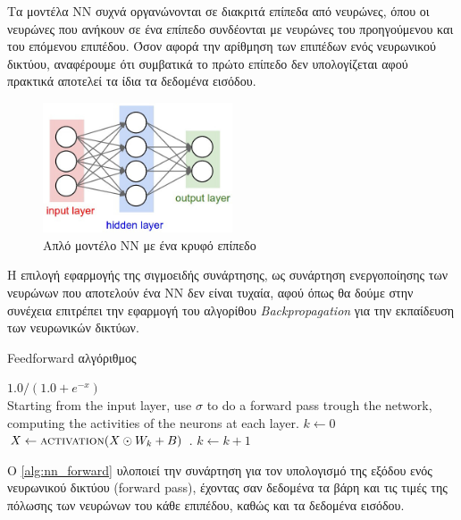 Τα μοντέλα ΝΝ συχνά οργανώνονται σε διακριτά επίπεδα από νευρώνες, όπου οι
νευρώνες που ανήκουν σε ένα επίπεδο συνδέονται με νευρώνες του
προηγούμενου και του επόμενου επιπέδου. Όσον αφορά την αρίθμηση
των επιπέδων ενός νευρωνικού δικτύου, αναφέρουμε ότι συμβατικά το πρώτο επίπεδο
δεν υπολογίζεται αφού πρακτικά αποτελεί τα ίδια τα δεδομένα εισόδου.

\begin{figure}[!ht]
  \centering
  \includegraphics[width=0.5\textwidth]{./images/chapter3/simple_nn.jpg}
  \caption[Απλό μοντέλο NN με ένα κρυφό επίπεδο]{Απλό μοντέλο NN με ένα κρυφό επίπεδο}
  \label{fig:simple_nn}
\end{figure}

Η επιλογή εφαρμογής της σιγμοειδής συνάρτησης, ως συνάρτηση ενεργοποίησης των
νευρώνων που αποτελούν ένα ΝΝ δεν είναι τυχαία, αφού όπως θα δούμε στην
συνέχεια επιτρέπει την εφαρμογή του αλγορίθου \emph{Backpropagation} για την
εκπαίδευση των νευρωνικών δικτύων.

\begin{algorithm}[!htp]
  \caption{Feedforward αλγόριθμος}
  \label{alg:nn_forward}
  \begin{algorithmic}[1]
      \State \Return $1.0 / (1.0 + e^{-x})$
    \EndFunction \\
      \State Starting from the input layer, use $\sigma$ to do
         a forward pass trough the network, computing the activities of the
        neurons at each layer.
      \State $k \gets 0$
      \State $X \gets \Call{activation}{X \odot W_{k} + B_{}}$  .
        \State $k \gets k+1$
      \EndWhile
    \EndProcedure
  \end{algorithmic}
\end{algorithm}

O \autoref{alg:nn_forward} υλοποιεί την συνάρτηση για τον υπολογισμό της εξόδου
ενός νευρωνικού δικτύου (forward pass), έχοντας σαν δεδομένα τα βάρη και τις τιμές της πόλωσης
των νευρώνων του κάθε επιπέδου, καθώς και τα δεδομένα εισόδου.



